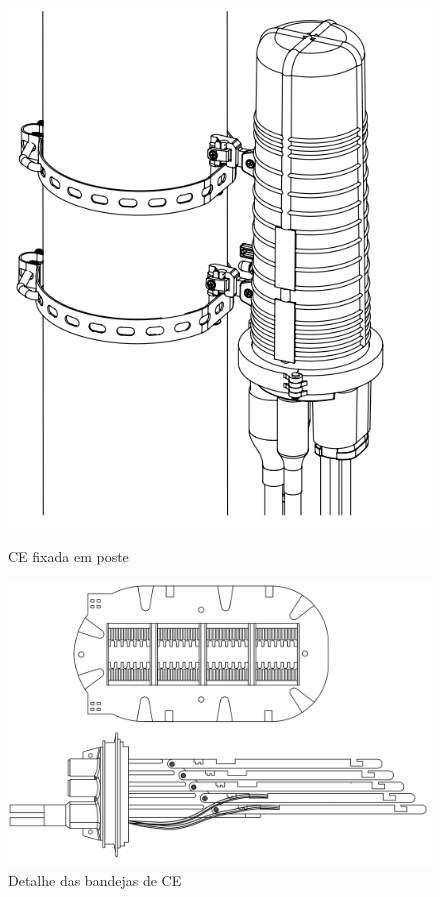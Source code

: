 \begin{figure}
  \begin{minipage}[c]{0.43\linewidth}
	\includegraphics[width=\linewidth]{./images/caixa_emenda_fixacao_em_poste.png}
	\caption{CE fixada em poste}
	\label{fig:ce_fixacao_poste}
  \end{minipage}
  \hfill
  \begin{minipage}[c]{0.6\linewidth}
	\includegraphics[width=\linewidth]{./images/caixa_emenda_detalhe_bandejas.png}
	\caption{Detalhe das bandejas de CE}
	\label{fig:ce_detalhe_bandejas}
  \end{minipage}
\end{figure}

